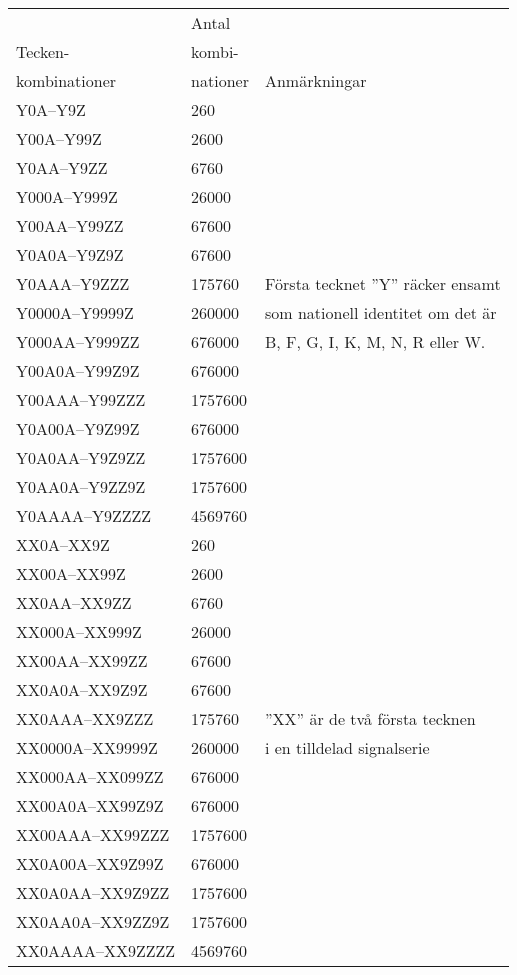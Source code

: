\begin{tabular}{l|l|l}
                & Antal    &  \\
  Tecken-       & kombi-   &  \\
  kombinationer & nationer & Anmärkningar \\
  \hline
  Y0A--Y9Z & 260 & \\
  Y00A--Y99Z & 2600 & \\
  Y0AA--Y9ZZ & 6760 & \\
  Y000A--Y999Z & 26000 & \\
  Y00AA--Y99ZZ & 67600 & \\
  Y0A0A--Y9Z9Z & 67600 & \\
  Y0AAA--Y9ZZZ & 175760 & Första tecknet ''Y'' räcker ensamt \\
  Y0000A--Y9999Z & 260000 & som nationell identitet om det är \\
  Y000AA--Y999ZZ & 676000 & B, F, G, I, K, M, N, R eller W. \\
  Y00A0A--Y99Z9Z & 676000 & \\
  Y00AAA--Y99ZZZ & 1757600 & \\
  Y0A00A--Y9Z99Z & 676000 & \\
  Y0A0AA--Y9Z9ZZ & 1757600 & \\
  Y0AA0A--Y9ZZ9Z & 1757600 & \\
  Y0AAAA--Y9ZZZZ & 4569760 & \\
  \hline
  XX0A--XX9Z & 260 & \\
  XX00A--XX99Z & 2600 & \\
  XX0AA--XX9ZZ & 6760 & \\
  XX000A--XX999Z & 26000 & \\
  XX00AA--XX99ZZ & 67600 & \\
  XX0A0A--XX9Z9Z & 67600 & \\
  XX0AAA--XX9ZZZ & 175760 & ''XX'' är de två första tecknen \\
  XX0000A--XX9999Z & 260000 & i en tilldelad signalserie \\
  XX000AA--XX099ZZ & 676000 & \\
  XX00A0A--XX99Z9Z & 676000 & \\
  XX00AAA--XX99ZZZ & 1757600 & \\
  XX0A00A--XX9Z99Z & 676000 & \\
  XX0A0AA--XX9Z9ZZ & 1757600 & \\
  XX0AA0A--XX9ZZ9Z & 1757600 & \\
  XX0AAAA--XX9ZZZZ & 4569760 & \\
\end{tabular}

